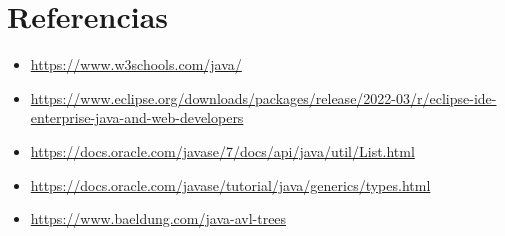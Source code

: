 \documentclass{article}
\begin{document}
	
  \newpage
  \section{Referencias}
  \begin{itemize}
    \item \url{https://www.w3schools.com/java/}
    \item \url{https://www.eclipse.org/downloads/packages/release/2022-03/r/eclipse-ide-enterprise-java-and-web-developers}
    \item \url{https://docs.oracle.com/javase/7/docs/api/java/util/List.html}
    \item \url{https://docs.oracle.com/javase/tutorial/java/generics/types.html}
    \item \url{https://www.baeldung.com/java-avl-trees}
  \end{itemize}

%
%
%
			
\end{document}
